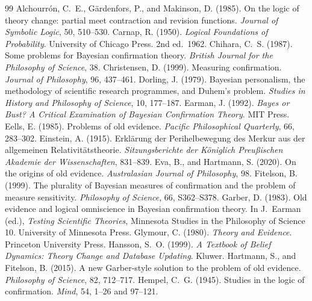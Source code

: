 \documentclass{situationist-preprint}
\begin{document}
\begin{thebibliography}{99}\small
{} Alchourr\'on, C.~E., G\"ardenfors, P., and Makinson, D. (1985). On the logic of theory change: partial meet contraction and revision functions. \emph{Journal of Symbolic Logic}, 50, 510--530.
 Carnap, R. (1950). \emph{Logical Foundations of Probability}. University of Chicago Press. 2nd ed.\ 1962.
 Chihara, C.~S. (1987). Some problems for Bayesian confirmation theory. \emph{British Journal for the Philosophy of Science}, 38.
 Christensen, D. (1999). Measuring confirmation. \emph{Journal of Philosophy}, 96, 437--461.
 Dorling, J. (1979). Bayesian personalism, the methodology of scientific research programmes, and Duhem's problem. \emph{Studies in History and Philosophy of Science}, 10, 177--187.
 Earman, J. (1992). \emph{Bayes or Bust? A Critical Examination of Bayesian Confirmation Theory}. MIT Press.
 Eells, E. (1985). Problems of old evidence. \emph{Pacific Philosophical Quarterly}, 66, 283--302.
 Einstein, A. (1915). Erkl\"arung der Perihelbewegung des Merkur aus der allgemeinen Relativit\"atstheorie. \emph{Sitzungsberichte der K\"oniglich Preu{\ss}ischen Akademie der Wissenschaften}, 831--839.
 Eva, B., and Hartmann, S. (2020). On the origins of old evidence. \emph{Australasian Journal of Philosophy}, 98.
 Fitelson, B. (1999). The plurality of Bayesian measures of confirmation and the problem of measure sensitivity. \emph{Philosophy of Science}, 66, S362--S378.
 Garber, D. (1983). Old evidence and logical omniscience in Bayesian confirmation theory. In J.~Earman (ed.), \emph{Testing Scientific Theories}, Minnesota Studies in the Philosophy of Science 10. University of Minnesota Press.
 Glymour, C. (1980). \emph{Theory and Evidence}. Princeton University Press.
 Hansson, S.~O. (1999). \emph{A Textbook of Belief Dynamics: Theory Change and Database Updating}. Kluwer.
 Hartmann, S., and Fitelson, B. (2015). A new Garber-style solution to the problem of old evidence. \emph{Philosophy of Science}, 82, 712--717.
 Hempel, C.~G. (1945). Studies in the logic of confirmation. \emph{Mind}, 54, 1--26 and 97--121.

\end{thebibliography}
\end{document}
